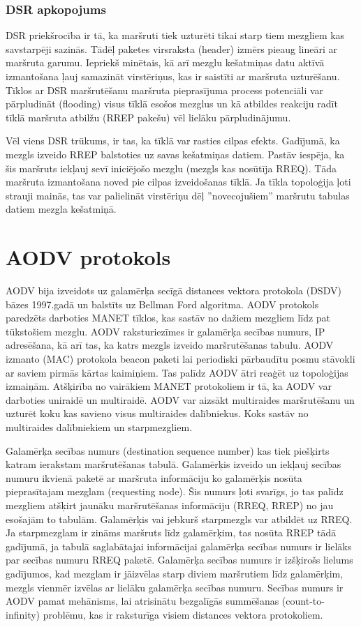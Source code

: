\subsubsection{DSR apkopojums}
DSR priekšrocība ir tā, ka maršruti tiek uzturēti tikai starp tiem mezgliem kas savstarpēji sazinās. Tādēļ paketes virsraksta (header) izmērs pieaug lineāri ar maršruta garumu. Iepriekš minētais, kā arī mezglu kešatmiņas datu aktīvā izmantošana ļauj samazināt virstēriņus, kas ir saistīti ar maršruta uzturēšanu. Tīklos ar DSR maršrutēšanu maršruta pieprasījuma process potenciāli var pārpludināt (flooding) visus tīklā esošos mezglus un kā atbildes reakciju radīt tīklā maršruta atbilžu (RREP pakešu) vēl lielāku pārpludinājumu.

Vēl viens DSR trūkums, ir tas, ka tīklā var rasties cilpas efekts. Gadījumā, ka mezgls izveido RREP balstoties uz savas kešatmiņas datiem. Pastāv iespēja, ka šis maršruts iekļauj sevī iniciējošo mezglu (mezgls kas nosūtīja RREQ). Tāda maršruta izmantošana noved pie cilpas izveidošanas tīklā. Ja tīkla topoloģija ļoti strauji mainās, tas var palielināt virstēriņu dēļ ''novecojušiem'' maršrutu tabulas datiem mezgla kešatmiņā.


\section{AODV protokols}
\acf{AODV} \cite{rfc3561} bija izveidots uz galamērķa secīgā distances vektora protokola (\acs{DSDV}) bāzes 1997.gadā un balstīts uz Bellman Ford algoritma. AODV protokols paredzēts darboties MANET tīklos, kas sastāv no dažiem mezgliem līdz pat tūkstošiem mezglu. AODV raksturiezīmes ir galamērķa secības numurs, IP adresēšana, kā arī tas, ka katrs mezgls izveido maršrutēšanas tabulu. AODV izmanto (\acs{MAC}) protokola beacon paketi lai periodiski pārbaudītu posmu stāvokli ar saviem pirmās kārtas kaimiņiem. Tas palīdz AODV ātri reaģēt uz topoloģijas izmaiņām. Atšķirība no vairākiem MANET protokoliem ir tā, ka AODV var darboties uniraidē un multiraidē. AODV var aizsākt multiraides maršrutēšanu un uzturēt koku kas savieno visus multiraides dalībniekus. Koks sastāv no multiraides dalībniekiem un starpmezgliem.

Galamērķa secības numurs (destination sequence number) kas tiek piešķirts katram ierakstam maršrutēšanas tabulā. Galamērķis izveido un iekļauj secības numuru ikvienā paketē ar maršruta informāciju ko galamērķis nosūta pieprasītajam mezglam (requesting node). Šis numurs ļoti svarīgs, jo tas palīdz mezgliem atšķirt jaunāku maršrutēšanas informāciju (RREQ, RREP) no jau esošajām to tabulām. Galamērķis vai jebkurš starpmezgls var atbildēt uz RREQ. Ja starpmezglam ir zināms maršruts līdz galamērķim, tas nosūta RREP tādā gadījumā, ja tabulā saglabātajai informācijai galamērķa secības numurs ir lielāks par secības numuru RREQ paketē. Galamērķa secības numurs ir izšķirošs lielums gadījumos, kad mezglam ir jāizvēlas starp diviem maršrutiem līdz galamērķim, mezgls vienmēr izvēlas ar lielāku galamērķa secības numuru. Secības numurs ir AODV pamat mehānisms, lai atrisinātu bezgalīgās summēšanas (count-to-infinity) problēmu, kas ir raksturīga visiem distances vektora protokoliem.

